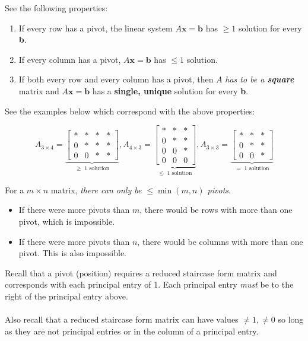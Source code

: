 \documentclass[12pt]{article}
\newcommand{\bt}[1]{\textbf{{#1}}}
\newcommand{\bm}[1]{\mathbf{{#1}}}
\newcommand{\mb}{\begin{bmatrix}}
\newcommand{\me}{\end{bmatrix}}
\begin{document}
See the following properties:

\begin{enumerate}
    \item If every row has a pivot, the linear system $A\bm{x} = \bm{b}$ has $\geq 1$ solution for every \bt{b}.
    \item If every column has a pivot, $A\bm{x} = \bm{b}$ has $\leq 1$ solution.
    \item If both every row and every column has a pivot, then $A$ \emph{has to be a \textbf{square}} matrix and $A\bm{x} = \bm{b}$ has a \bt{single, unique} solution for every \bt{b}.
\end{enumerate}

See the examples below which correspond with the above properties:

$$
A_{3 \times 4} = \underbrace{\mb
* & * & * & * \\
0 & * & * & * \\
0 & 0 & * & * \me}_{\geq \; 1 \textrm{ solution}},
A_{4\times 3} = \underbrace{\mb
* & * & * \\
0 & * & * \\
0 & 0 & * \\
0 & 0 & 0 \me}_{\leq \; 1 \textrm{ solution}},
A_{3 \times 3} = \underbrace{\mb
* & * & * \\
0 & * & * \\
0 & 0 & * \me}_{= \; 1 \textrm{ solution}}
$$

For a $m\times n$ matrix, \emph{there can only be $\leq \min (m, n)$ pivots}.

\begin{itemize}
    \item If there were more pivots than $m$, there would be rows with more than one pivot, which is impossible.
    \item If there were more pivots than $n$, there would be columns with more than one pivot. This is also impossible.
    
\end{itemize}

Recall that a pivot (position) requires a reduced staircase form matrix and corresponds with each principal entry of 1. Each principal entry \emph{must} be to the right of the principal entry above. \\ \\

Also recall that a reduced staircase form matrix can have values $\neq 1, \neq 0$ so long as they are not principal entries or in the column of a principal entry. \\ \\
\end{document}
